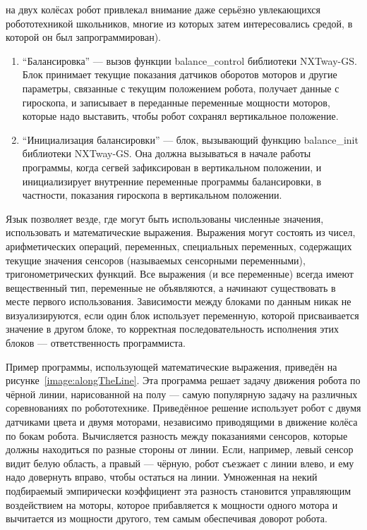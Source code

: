 \begin{enumerate}
		на двух колёсах робот привлекал внимание даже серьёзно увлекающихся робототехникой 
		школьников, многие из которых затем интересовались средой, в которой он был запрограммирован).
		\begin{enumerate}
			\item "`Балансировка"' --- вызов функции balance\_control библиотеки NXTway-GS. 
				Блок принимает текущие показания датчиков оборотов моторов и другие параметры, 
				связанные с текущим положением робота, получает данные с гироскопа, и записывает 
				в переданные переменные мощности моторов, которые надо выставить, чтобы робот 
				сохранял вертикальное положение.
			\item "`Инициализация балансировки"' --- блок, вызывающий функцию balance\_init 
				библиотеки NXTway-GS. Она должна вызываться в начале работы программы, когда 
				сегвей зафиксирован в вертикальном положении, и инициализирует внутренние 
				переменные программы балансировки, в частности, показания гироскопа в вертикальном 
				положении.
		\end{enumerate}
\end{enumerate}

Язык позволяет везде, где могут быть использованы численные значения, использовать 
и математические выражения. Выражения могут состоять из чисел, арифметических операций, переменных, специальных переменных, содержащих текущие значения сенсоров (называемых сенсорными переменными), тригонометрических функций. Все выражения (и все переменные) всегда имеют вещественный тип, переменные не объявляются, а начинают существовать в месте первого использования. Зависимости между блоками по данным никак не визуализируются, если один блок использует переменную, которой присваивается значение в другом блоке, то корректная последовательность исполнения этих блоков --- ответственность программиста. 

Пример программы, использующей математические выражения, приведён на рисунке~\ref{image:alongTheLine}. 
Эта программа решает задачу движения робота по чёрной линии, нарисованной на полу --- 
самую популярную задачу на различных соревнованиях по робототехнике. Приведённое решение 
использует робот с двумя датчиками цвета и двумя моторами, независимо приводящими в 
движение колёса по бокам робота. Вычисляется разность между показаниями сенсоров, 
которые должны находиться по разные стороны от линии. Если, например, левый сенсор 
видит белую область, а правый --- чёрную, робот съезжает с линии влево, и ему надо 
довернуть вправо, чтобы остаться на линии. Умноженная на некий подбираемый эмпирически 
коэффициент эта разность становится управляющим воздействием на моторы, которое прибавляется 
к мощности одного мотора и вычитается из мощности другого, тем самым обеспечивая доворот робота.

